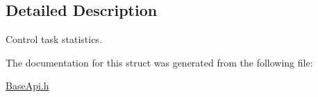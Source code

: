 \subsection{Detailed Description}
Control task statistics. 

The documentation for this struct was generated from the following file\+:\begin{DoxyCompactItemize}
\item 
\hyperlink{BaseApi_8h}{Base\+Api.\+h}\end{DoxyCompactItemize}
